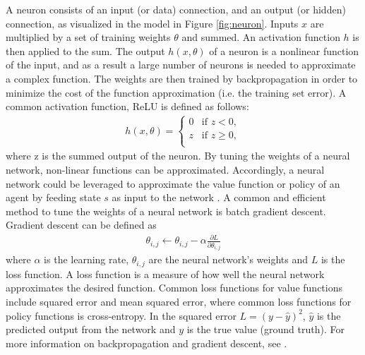     
A neuron consists of an input (or data) connection, and an output (or hidden) connection, as visualized in the model in Figure \ref{fig:neuron}. Inputs $x$ are multiplied by a set of training weights $\theta$ and summed. An activation function $h$ is then applied to the sum. The output $h(x,\theta)$ of a neuron is a nonlinear function of the input, and as a result a large number of neurons is needed to approximate a complex function. The weights are then trained by backpropagation in order to minimize the cost of the function approximation (i.e. the training set error). A common activation function, ReLU is defined as follows:
\begin{gather}
    h(x,\theta) =
    \begin{cases}
        0 & \text{if } z < 0,\\
        z & \text{if } z \ge 0,\\
    \end{cases}
    \label{eu_neural_network_cases}
\end{gather}
where z is the summed output of the neuron. By tuning the weights of a neural network, non-linear functions can be approximated. Accordingly, a neural network could be leveraged to approximate the value function or policy of an agent by feeding state $s$ as input to the network \cite{eriksson2021deep}. 
A common and efficient method to tune the weights of a neural network is batch gradient descent. Gradient descent can be defined as
\begin{gather}
    \theta_{i, j} \leftarrow \theta_{i, j}-\alpha \frac{\partial L}{\partial \theta_{i, j}}
    \label{eu_neural_networks_weights}
\end{gather}
where $\alpha$ is the learning rate, $\theta_{i,j}$ are the neural network's weights and $L$ is the loss function.
A loss function is a measure of how well the neural network approximates the desired function. Common loss functions for value functions include squared error and mean squared error, where common loss functions for policy functions is cross-entropy. In the squared error $L=(y-\hat{y})^{2}$, $\hat{y}$ is the predicted output from the network and $y$ is the true value (ground truth).  For more information on backpropagation and gradient descent, see \cite{sutton2018reinforcement}. 

